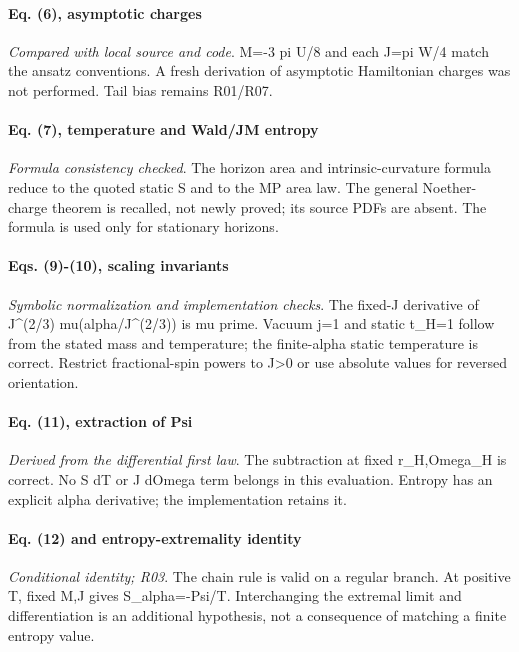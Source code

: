 \documentclass[10pt,a4paper]{article}
\begin{document}
\paragraph{Eq. (6), asymptotic charges} \textit{Compared with local source and code}. M=-3 pi U/8 and each J=pi W/4 match the ansatz conventions. A fresh derivation of asymptotic Hamiltonian charges was not performed. Tail bias remains R01/R07.

\paragraph{Eq. (7), temperature and Wald/JM entropy} \textit{Formula consistency checked}. The horizon area and intrinsic-curvature formula reduce to the quoted static S and to the MP area law. The general Noether-charge theorem is recalled, not newly proved; its source PDFs are absent. The formula is used only for stationary horizons.

\paragraph{Eqs. (9)-(10), scaling invariants} \textit{Symbolic normalization and implementation checks}. The fixed-J derivative of J\textasciicircum{}(2/3) mu(alpha/J\textasciicircum{}(2/3)) is mu prime. Vacuum j=1 and static t\_H=1 follow from the stated mass and temperature; the finite-alpha static temperature is correct. Restrict fractional-spin powers to J\textgreater{}0 or use absolute values for reversed orientation.

\paragraph{Eq. (11), extraction of Psi} \textit{Derived from the differential first law}. The subtraction at fixed r\_H,Omega\_H is correct. No S dT or J dOmega term belongs in this evaluation. Entropy has an explicit alpha derivative; the implementation retains it.

\paragraph{Eq. (12) and entropy-extremality identity} \textit{Conditional identity; R03}. The chain rule is valid on a regular branch. At positive T, fixed M,J gives S\_alpha=-Psi/T. Interchanging the extremal limit and differentiation is an additional hypothesis, not a consequence of matching a finite entropy value.
\end{document}
